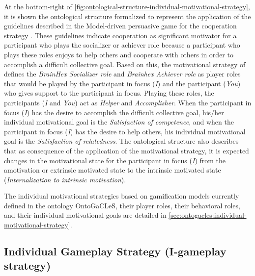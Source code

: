 At the bottom-right of \autoref{fig:ontological-structure-individual-motivational-strategy}, it is shown the ontological structure formalized to represent the application of the guidelines described in the Model-driven persuasive game for the cooperation strategy \cite{OrjiVassilevaMandryk2014}. These guidelines indicate cooperation as significant motivator for a participant who plays the socializer or achiever role because a participant who plays these roles enjoys to help others and cooperate with others in order to accomplish a difficult collective goal. Based on this, the motivational strategy of  defines the \emph{BrainHex Socializer role} and \emph{Brainhex Achiever role} as player roles that would be played by the participant in focus (\emph{I}) and the participant (\emph{You}) who gives support to the participant in focus. Playing these roles, the participants (\emph{I} and \emph{You}) act as \emph{Helper} and \emph{Accomplisher}. When the participant in focus (\emph{I}) has the desire to accomplish the difficult collective goal, his/her individual motivational goal is the \emph{Satisfaction of competence}, and when the participant in focus (\emph{I}) has the desire to help others, his individual motivational goal is the \emph{Satisfaction of relatedness}. The ontological structure also describes that as consequence of the application of the motivational strategy, it is expected changes in the motivational state for the participant in focus (\emph{I}) from the amotivation or extrinsic motivated state to the intrinsic motivated state (\emph{Internalization to intrinsic motivation}).

The individual motivational strategies based on gamification models currently defined in the ontology OntoGaCLeS, their player roles, their behavioral roles, and their individual motivational goals are detailed in \autoref{sec:ontogacles:individual-motivational-strategy}.

\subsection{Individual Gameplay Strategy (I-gameplay strategy)}
\label{sec:individual-gameplay-strategy}

